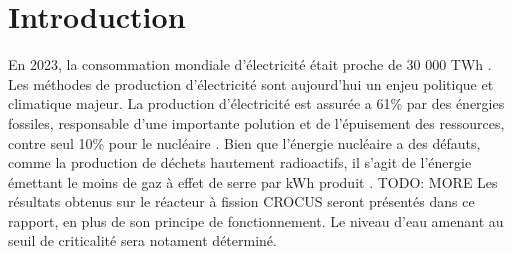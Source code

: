 \section{Introduction}

 En 2023, la consommation mondiale d'électricité était proche de 30 000 TWh \cite{owid-energy}. Les méthodes de production d'électricité sont aujourd'hui un enjeu politique et climatique majeur. La production d'électricité est assurée a 61\% par des énergies fossiles, responsable d'une importante polution et de l'épuisement des ressources, contre seul 10\% pour le nucléaire \cite{owid-electricity-mix}. Bien que l'énergie nucléaire a des défauts, comme la production de déchets hautement radioactifs, il s'agit de l'énergie émettant le moins de gaz à effet de serre par kWh produit \cite{owid-nuclear-energy}. TODO: MORE
 Les résultats obtenus sur le réacteur à fission CROCUS seront présentés dans ce rapport, en plus de son principe de fonctionnement. Le niveau d'eau amenant au seuil de criticalité sera notament déterminé.